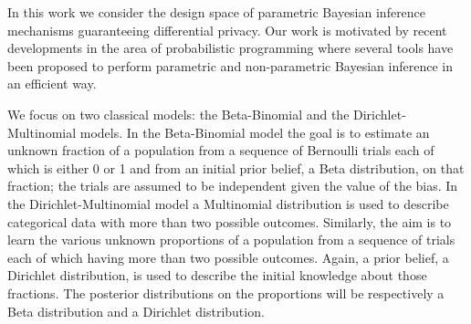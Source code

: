 \documentclass{article}
\begin{document}

In this work we consider the design space of  parametric Bayesian
inference mechanisms guaranteeing differential privacy. Our work is
motivated by recent developments in the area of probabilistic
programming where several tools have been proposed to perform
parametric and non-parametric Bayesian inference in an efficient
way.






We focus on two classical models: the Beta-Binomial and the
Dirichlet-Multinomial models. In the Beta-Binomial model the goal
is to estimate an unknown fraction of a population from a sequence
of Bernoulli trials each of which is either 0 or 1 and from an initial
prior belief, a Beta distribution, on that fraction; the trials are assumed to be independent
given the value of the bias. In the Dirichlet-Multinomial model a Multinomial
distribution is used to describe categorical data with more than
two possible outcomes. Similarly, the aim is to learn the various
unknown proportions of a population from a sequence of trials
each of which having more than two possible outcomes. Again,
a prior belief, a Dirichlet distribution, is used to describe the initial knowledge
about those fractions. The posterior distributions on the proportions will be
respectively a Beta distribution and a Dirichlet distribution.
\end{document}
